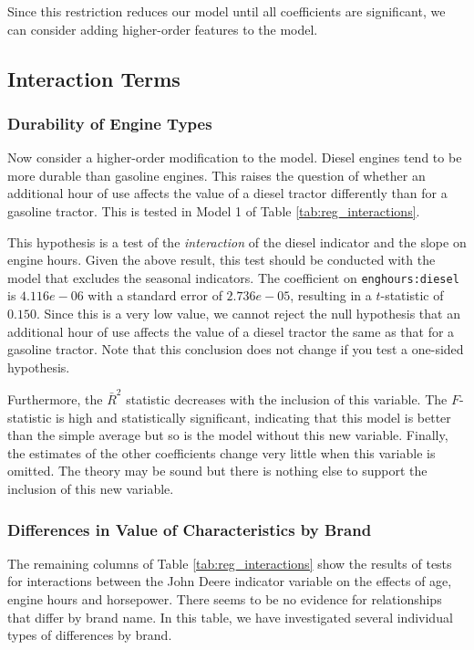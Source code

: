 \documentclass[11pt]{paper}
\begin{document}
Since this restriction reduces our model until all coefficients
are significant, we can consider adding higher-order 
features to the model.

\clearpage
\subsection{Interaction Terms}

\subsubsection{Durability of Engine Types}

Now consider a higher-order modification to the model. 
Diesel engines tend to be more durable than gasoline engines. 
This raises the question of whether an additional hour of use affects the value of a diesel tractor differently than for a gasoline tractor. 
This is tested in Model 1 of Table \ref{tab:reg_interactions}. 

	This hypothesis is a test of the \emph{interaction} of the diesel indicator and the slope on engine hours. 
      Given the above result, this test should be conducted with the model that excludes the seasonal indicators. 
The coefficient on \texttt{enghours:diesel} is $4.116e-06$ with a standard error of $2.736e-05$, resulting in a $t$-statistic of $0.150$. 
Since this is a very low value, we cannot reject the null hypothesis that an additional hour of use affects the value of a diesel tractor the same as that for a gasoline tractor. 
Note that this conclusion does not change if you test a one-sided hypothesis.  

Furthermore, the $\bar{R}^2$ statistic decreases with the inclusion of this variable. 
The $F$-statistic is high and statistically significant, indicating that this model is better than the simple average but so is the model without this new variable. 
Finally, the estimates of the other coefficients change very little when this variable is omitted. 
The theory may be sound but there is nothing else to support the inclusion of this new variable. 



\subsubsection{Differences in Value of Characteristics by Brand}

The remaining columns of Table \ref{tab:reg_interactions}
show the results of tests for interactions
between the John Deere indicator variable
on the effects of age, engine hours and horsepower. 
There seems to be no evidence for relationships that differ by
brand name. 
In this table, we have investigated several 
individual types of differences by brand. 
\end{document}
